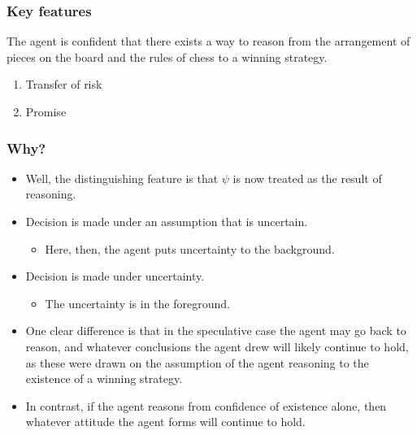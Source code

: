 \documentclass[10pt]{article}
\begin{document}
\subsubsection{Key features}
\label{sec:key-features}

The agent is confident that there exists a way to reason from the arrangement of pieces on the board and the rules of chess to a winning strategy.

\begin{enumerate}
\item Transfer of risk
\item Promise
\end{enumerate}


\subsubsection{Why?}
\label{sec:why}

\begin{itemize}
\item Well, the distinguishing feature is that \(\psi\) is now treated as the result of reasoning.
\end{itemize}

\begin{itemize}
\item Decision is made under an assumption that is uncertain.
  \begin{itemize}
  \item Here, then, the agent puts uncertainty to the background.
  \end{itemize}
\item Decision is made under uncertainty.
  \begin{itemize}
  \item The uncertainty is in the foreground.
  \end{itemize}
\end{itemize}

\begin{itemize}
\item One clear difference is that in the speculative case the agent may go back to reason, and whatever conclusions the agent drew will likely continue to hold, as these were drawn on the assumption of the agent reasoning to the existence of a winning strategy.
\item In contrast, if the agent reasons from confidence of existence alone, then whatever attitude the agent forms will continue to hold.
\end{itemize}
\end{document}
